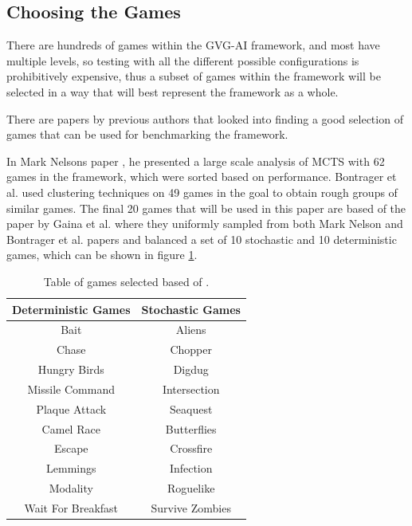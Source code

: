 \documentclass[journal]{IEEEtran}
\begin{document}
	\subsection{Choosing the Games}
	
	There are hundreds of games within the GVG-AI framework, and most have multiple levels, so testing with all the different possible configurations is prohibitively expensive, thus a subset of games within the framework will be selected in a way that will best represent the framework as a whole.
	
	There are papers by previous authors that looked into finding a good selection of games that can be used for benchmarking the framework. \cite{gaina2017population}
	
	In Mark Nelsons paper \cite{nelson2016investigating}, he presented a large scale analysis of MCTS with 62 games in the framework, which were sorted based on performance. Bontrager et al. \cite{bontrager2016matching} used clustering techniques on 49 games in the goal to obtain rough groups of similar games.
	The final 20 games that will be used in this paper are based of the paper by Gaina et al. \cite{gaina2017population} where they uniformly sampled from both Mark Nelson and Bontrager et al. papers and balanced a set of 10 stochastic and 10 deterministic games, which can be shown in figure \ref{GamesTable}.
	
	
	\begin{table}[h!]
	\centering
	\begin{tabular} { |c||c|} 
		 \hline
		 \bf{Deterministic Games} & \bf{Stochastic Games} \\
		 \hline
		 Bait & Aliens  \\
 		Chase  & Chopper   \\
		Hungry Birds  & Digdug   \\
		Missile Command  & Intersection   \\
		Plaque Attack  & Seaquest   \\
		Camel Race  & Butterflies   \\
		Escape  & Crossfire   \\
		Lemmings  & Infection   \\
		Modality  & Roguelike   \\
		Wait For Breakfast  & Survive Zombies   \\
		\hline
	\end{tabular}
	\caption{Table of games selected based of \cite{guerrero2017beyond, gaina2017population}.}
	\label{GamesTable}
	\end{table}
	
\end{document}
